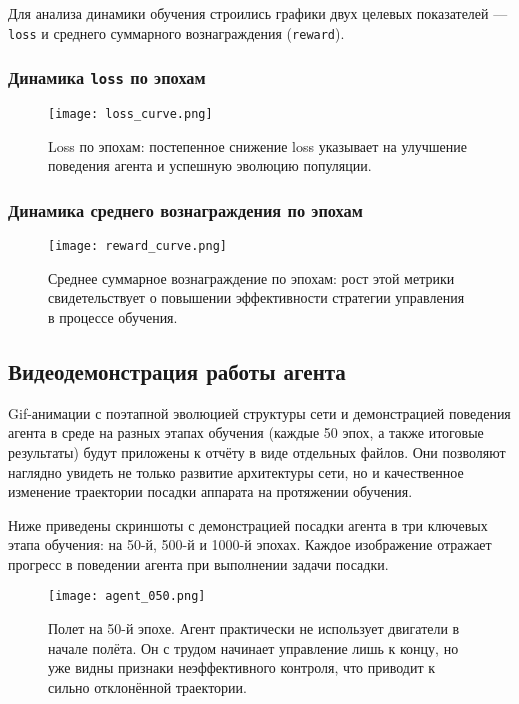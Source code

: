 \documentclass[a4paper,12pt]{article}
\begin{document}
Для анализа динамики обучения строились графики двух целевых показателей — \texttt{loss} и среднего суммарного вознаграждения (\texttt{reward}).

\subsubsection{Динамика \texttt{loss} по эпохам}

\begin{figure}[H]
	\centering
	\texttt{[image: loss\_curve.png]}
	\caption{Loss по эпохам: постепенное снижение loss указывает на улучшение поведения агента и успешную эволюцию популяции.}
	\label{fig:loss_epochs}
\end{figure}

\subsubsection{Динамика среднего вознаграждения по эпохам}

\begin{figure}[H]
	\centering
	\texttt{[image: reward\_curve.png]}
	\caption{Среднее суммарное вознаграждение по эпохам: рост этой метрики свидетельствует о повышении эффективности стратегии управления в процессе обучения.}
	\label{fig:reward_epochs}
\end{figure}

\subsection{Видеодемонстрация работы агента}

Gif-анимации с поэтапной эволюцией структуры сети и демонстрацией поведения агента в среде на разных этапах обучения (каждые 50 эпох, а также итоговые результаты) будут приложены к отчёту в виде отдельных файлов. Они позволяют наглядно увидеть не только развитие архитектуры сети, но и качественное изменение траектории посадки аппарата на протяжении обучения.

Ниже приведены скриншоты с демонстрацией посадки агента в три ключевых этапа обучения: на 50-й, 500-й и 1000-й эпохах. Каждое изображение отражает прогресс в поведении агента при выполнении задачи посадки.

\begin{figure}[H]
	\centering
	\texttt{[image: agent\_050.png]}
	\caption{Полет на 50-й эпохе. Агент практически не использует двигатели в начале полёта. Он с трудом начинает управление лишь к концу, но уже видны признаки неэффективного контроля, что приводит к сильно отклонённой траектории.}
	\label{fig:landing_epoch1}
\end{figure}
\end{document}
